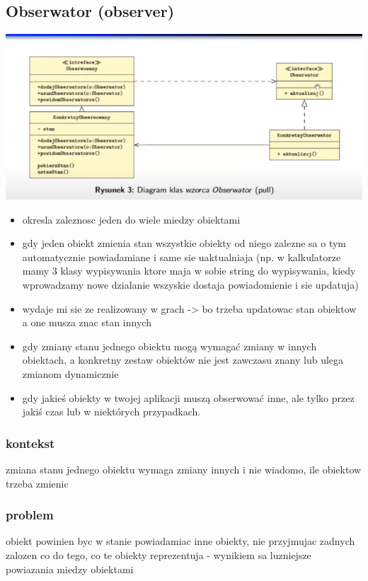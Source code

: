 \documentclass[11pt]{article}
\begin{document}
\subsection{Obserwator (observer)}
\label{sec:org8631a50}
\begin{center}
\includegraphics[width=.9\linewidth]{./obserwator.png}
\end{center}
\begin{itemize}
\item okresla zaleznosc jeden do wiele miedzy obiektami
\item gdy jeden obiekt zmienia stan wszystkie obiekty od niego zalezne sa o tym automatycznie powiadamiane i same sie uaktualniaja (np. w kalkulatorze mamy 3 klasy wypisywania ktore maja w sobie string do wypisywania, kiedy wprowadzamy nowe dzialanie wszyskie dostaja powiadomienie i sie  updatuja)
\item wydaje mi sie ze realizowany w grach -> bo trzeba updatowac stan obiektow a one musza znac stan innych
\item gdy zmiany stanu jednego obiektu mogą wymagać zmiany w innych obiektach, a konkretny zestaw obiektów nie jest zawczasu znany lub ulega zmianom dynamicznie
\item gdy jakieś obiekty w twojej aplikacji muszą obserwować inne, ale tylko przez jakiś czas lub w niektórych przypadkach.
\end{itemize}
\subsubsection{kontekst}
\label{sec:org9485ecc}
zmiana stanu jednego obiektu wymaga zmiany innych i nie wiadomo, ile obiektow trzeba zmienic
\subsubsection{problem}
\label{sec:org8101d8a}
obiekt powinien byc w stanie powiadamiac inne obiekty, nie przyjmujac zadnych zalozen co do tego, co te obiekty reprezentuja - wynikiem sa luzniejsze powiazania miedzy obiektami
\end{document}
